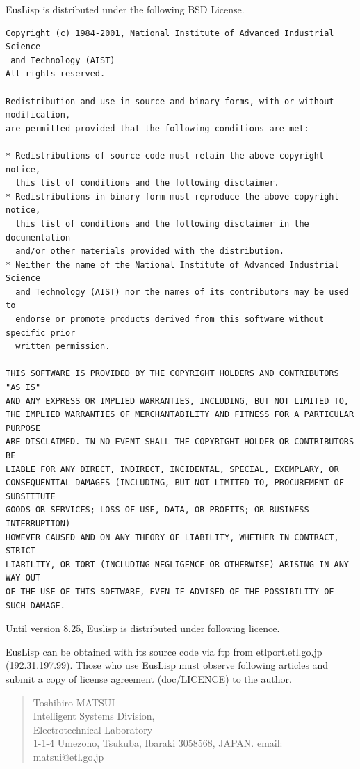 EusLisp is distributed under the following BSD License.

\begin{verbatim}
Copyright (c) 1984-2001, National Institute of Advanced Industrial Science
 and Technology (AIST)
All rights reserved.

Redistribution and use in source and binary forms, with or without modification,
are permitted provided that the following conditions are met:

* Redistributions of source code must retain the above copyright notice,
  this list of conditions and the following disclaimer.
* Redistributions in binary form must reproduce the above copyright notice,
  this list of conditions and the following disclaimer in the documentation
  and/or other materials provided with the distribution.
* Neither the name of the National Institute of Advanced Industrial Science
  and Technology (AIST) nor the names of its contributors may be used to 
  endorse or promote products derived from this software without specific prior 
  written permission.

THIS SOFTWARE IS PROVIDED BY THE COPYRIGHT HOLDERS AND CONTRIBUTORS "AS IS" 
AND ANY EXPRESS OR IMPLIED WARRANTIES, INCLUDING, BUT NOT LIMITED TO, 
THE IMPLIED WARRANTIES OF MERCHANTABILITY AND FITNESS FOR A PARTICULAR PURPOSE 
ARE DISCLAIMED. IN NO EVENT SHALL THE COPYRIGHT HOLDER OR CONTRIBUTORS BE 
LIABLE FOR ANY DIRECT, INDIRECT, INCIDENTAL, SPECIAL, EXEMPLARY, OR 
CONSEQUENTIAL DAMAGES (INCLUDING, BUT NOT LIMITED TO, PROCUREMENT OF SUBSTITUTE 
GOODS OR SERVICES; LOSS OF USE, DATA, OR PROFITS; OR BUSINESS INTERRUPTION) 
HOWEVER CAUSED AND ON ANY THEORY OF LIABILITY, WHETHER IN CONTRACT, STRICT 
LIABILITY, OR TORT (INCLUDING NEGLIGENCE OR OTHERWISE) ARISING IN ANY WAY OUT 
OF THE USE OF THIS SOFTWARE, EVEN IF ADVISED OF THE POSSIBILITY OF SUCH DAMAGE.
\end{verbatim}

Until version 8.25, Euslisp is distributed under following licence.

EusLisp can be obtained with its source code via ftp from
etlport.etl.go.jp (192.31.197.99).
Those who use EusLisp must observe  following articles
and submit a copy of license agreement (doc/LICENCE) to the author.
\begin{quote}
\begin{tabbing}
Toshihiro MATSUI \hspace{50mm} \= \\
Intelligent Systems Division, \>  \\
Electrotechnical Laboratory  \>  \\
1-1-4 Umezono,
Tsukuba, Ibaraki 3058568, JAPAN. \> email: matsui@etl.go.jp \\
\end{tabbing}
\end{quote}

